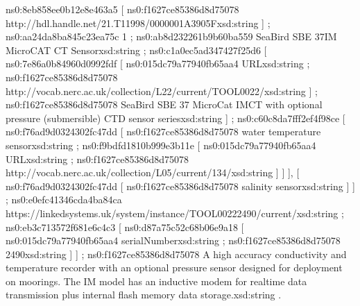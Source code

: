 \documentclass[a4paper,10pt,english]{sphinxmanual}
\begin{document}
\begin{sphinxVerbatim}[commandchars=\\\{\}]
    ns0:8eb858ee0b12e8e463a5 [ ns0:f1627ce85386d8d75078 \PYGZdq{}http://hdl.handle.net/21.T11998/0000\PYGZhy{}001A\PYGZhy{}3905\PYGZhy{}F\PYGZdq{}\PYGZca{}\PYGZca{}xsd:string ] ;
    ns0:aa24da8ba845c23ea75c 1 ;
    ns0:ab8d232261b9b60ba559 \PYGZdq{}Sea\PYGZhy{}Bird SBE 37\PYGZhy{}IM MicroCAT C\PYGZhy{}T Sensor\PYGZdq{}\PYGZca{}\PYGZca{}xsd:string ;
    ns0:c1a0ec5ad347427f25d6 [
      ns0:7e86a0b84960d0992fdf [
        ns0:015dc79a77940fb65aa4 \PYGZdq{}URL\PYGZdq{}\PYGZca{}\PYGZca{}xsd:string ;
        ns0:f1627ce85386d8d75078 \PYGZdq{}http://vocab.nerc.ac.uk/collection/L22/current/TOOL0022/\PYGZdq{}\PYGZca{}\PYGZca{}xsd:string
      ] ;
      ns0:f1627ce85386d8d75078 \PYGZdq{}Sea\PYGZhy{}Bird SBE 37 MicroCat IM\PYGZhy{}CT with optional pressure (submersible) CTD sensor series\PYGZdq{}\PYGZca{}\PYGZca{}xsd:string
    ] ;
    ns0:c60c8da7fff2ef4f98ce [ ns0:f76ad9d0324302fc47dd [
        ns0:f1627ce85386d8d75078 \PYGZdq{}water temperature sensor\PYGZdq{}\PYGZca{}\PYGZca{}xsd:string ;
        ns0:f9bdfd1810b999e3b11e [
          ns0:015dc79a77940fb65aa4 \PYGZdq{}URL\PYGZdq{}\PYGZca{}\PYGZca{}xsd:string ;
          ns0:f1627ce85386d8d75078 \PYGZdq{}http://vocab.nerc.ac.uk/collection/L05/current/134/\PYGZdq{}\PYGZca{}\PYGZca{}xsd:string
        ]
      ] ], [ ns0:f76ad9d0324302fc47dd [ ns0:f1627ce85386d8d75078 \PYGZdq{}salinity sensor\PYGZdq{}\PYGZca{}\PYGZca{}xsd:string ] ] ;
    ns0:e0efc41346cda4ba84ca \PYGZdq{}https://linkedsystems.uk/system/instance/TOOL0022\PYGZus{}2490/current/\PYGZdq{}\PYGZca{}\PYGZca{}xsd:string ;
    ns0:eb3c713572f681e6c4c3 [ ns0:d87a75c52c68b06e9a18 [
        ns0:015dc79a77940fb65aa4 \PYGZdq{}serialNumber\PYGZdq{}\PYGZca{}\PYGZca{}xsd:string ;
        ns0:f1627ce85386d8d75078 \PYGZdq{}2490\PYGZdq{}\PYGZca{}\PYGZca{}xsd:string
      ] ] ;
    ns0:f1627ce85386d8d75078 \PYGZdq{}A high accuracy conductivity and temperature recorder with an optional pressure sensor designed for deployment on moorings. The IM model has an inductive modem for real\PYGZhy{}time data transmission plus internal flash memory data storage.\PYGZdq{}\PYGZca{}\PYGZca{}xsd:string .
\end{sphinxVerbatim}
\end{document}

